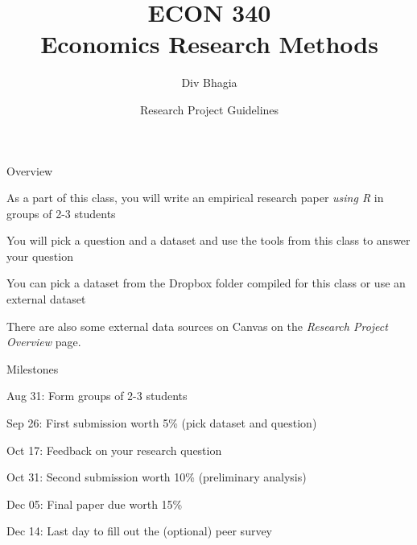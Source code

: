 \documentclass{./../Lectures/div_teaching_slides}
\begin{document}
\title{ECON 340 \\ Economics Research Methods}
\author{Div Bhagia}
\date{Research Project Guidelines}

\begin{frame}
\maketitle
\end{frame}



\begin{frame}{Overview}
\begin{witemize}
\item As a part of this class, you will write an empirical research paper \textit{using R} in groups of 2-3 students 
\item You will pick a question and a dataset and use the tools from this class to answer your question 
\item You can pick a dataset from the  Dropbox folder compiled for this class or use an external dataset
\item There are also some external data sources on Canvas on the \textit{Research Project Overview} page. 
\end{witemize}
\end{frame}

\begin{frame}{Milestones}
\begin{witemize}
\item Aug 31: Form groups of 2-3 students 
\item Sep 26: First submission worth 5\% (pick dataset and question)
\item Oct 17: Feedback on your research question
\item Oct 31: Second submission worth 10\% (preliminary analysis)
\item Dec 05: Final paper due worth 15\%
\item Dec 14: Last day to fill out the (optional) peer survey
\end{witemize}
\end{frame}

\section{}
\end{document}
